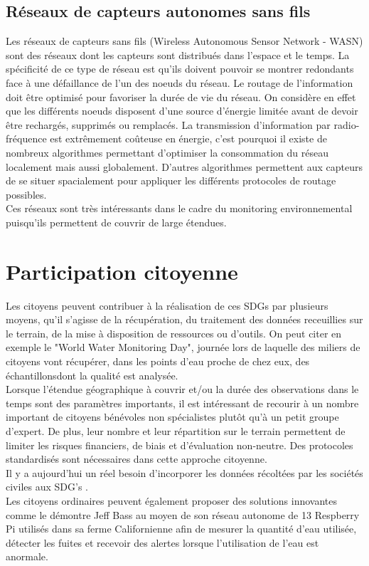 \documentclass[10pt, article]{llncs}
\begin{document}
		\subsection{Réseaux de capteurs autonomes sans fils}
			Les réseaux de capteurs sans fils (Wireless Autonomous Sensor Network - WASN) sont des réseaux dont les capteurs sont distribués dans l'espace et le temps. La spécificité de ce type de réseau est qu'ils doivent pouvoir se montrer redondants face à une défaillance de l'un des noeuds du réseau. Le routage de l'information doit être optimisé pour favoriser la durée de vie du réseau. On considère en effet que les différents noeuds disposent d'une source d'énergie limitée avant de devoir être rechargés, supprimés ou remplacés. La transmission d'information par radio-fréquence est extrêmement coûteuse en énergie, c'est pourquoi il existe de nombreux algorithmes permettant d'optimiser la consommation du réseau localement mais aussi globalement. D'autres algorithmes permettent aux capteurs de se situer spacialement pour appliquer les différents protocoles de routage possibles.\\
			Ces réseaux sont très intéressants dans le cadre du monitoring environnemental puisqu'ils permettent de couvrir de large étendues. \cite{professor_course_nodate}
		
\section{Participation citoyenne}
	Les citoyens peuvent contribuer à la réalisation de ces SDGs par plusieurs moyens, qu'il s'agisse de la récupération, du traitement des données receuillies sur le terrain, de la mise à disposition de ressources ou d'outils. On peut citer en exemple le "World Water Monitoring Day", journée lors de laquelle des miliers de citoyens vont récupérer, dans les points d'eau proche de chez eux, des échantillonsdont la qualité est analysée. \\
	Lorsque l'étendue géographique à couvrir et/ou la durée des observations dans le temps sont des paramètres importants, il est intéressant de recourir à un nombre important de citoyens bénévoles non spécialistes plutôt qu'à un petit groupe d'expert. De plus, leur nombre et leur répartition sur le terrain permettent de limiter les risques financiers, de biais et d'évaluation non-neutre. Des protocoles standardisés sont nécessaires dans cette approche citoyenne.\\
	Il y a aujourd'hui un réel besoin d'incorporer les données récoltées par les sociétés civiles aux SDG's \cite{fluckiger_sustainable_2016}.\\
	Les citoyens ordinaires peuvent également proposer des solutions innovantes comme le démontre Jeff Bass au moyen de son réseau autonome de 13 Respberry Pi utilisés dans sa ferme Californienne afin de mesurer la quantité d'eau utilisée, détecter les fuites et recevoir des alertes lorsque l'utilisation de l'eau est anormale. \cite{noauthor_jeff_nodate}
	
\end{document}
